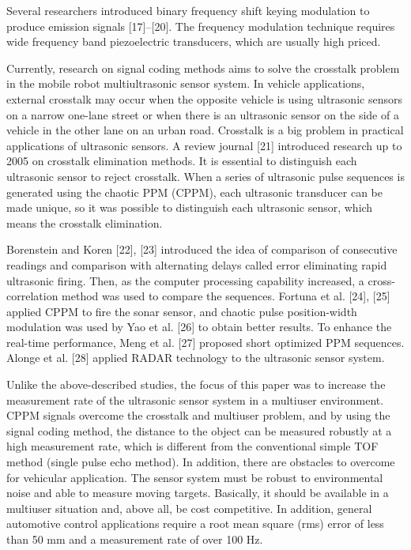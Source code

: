 Several researchers introduced binary frequency shift keying modulation to produce emission signals [17]–​[20]. The frequency modulation technique requires wide frequency band piezoelectric transducers, which are usually high priced.

Currently, research on signal coding methods aims to solve the crosstalk problem in the mobile robot multiultrasonic sensor system. In vehicle applications, external crosstalk may occur when the opposite vehicle is using ultrasonic sensors on a narrow one-lane street or when there is an ultrasonic sensor on the side of a vehicle in the other lane on an urban road. Crosstalk is a big problem in practical applications of ultrasonic sensors. A review journal [21] introduced research up to 2005 on crosstalk elimination methods. It is essential to distinguish each ultrasonic sensor to reject crosstalk. When a series of ultrasonic pulse sequences is generated using the chaotic PPM (CPPM), each ultrasonic transducer can be made unique, so it was possible to distinguish each ultrasonic sensor, which means the crosstalk elimination.

Borenstein and Koren [22], [23] introduced the idea of comparison of consecutive readings and comparison with alternating delays called error eliminating rapid ultrasonic firing. Then, as the computer processing capability increased, a cross-correlation method was used to compare the sequences. Fortuna et al. [24], [25] applied CPPM to fire the sonar sensor, and chaotic pulse position-width modulation was used by Yao et al. [26] to obtain better results. To enhance the real-time performance, Meng et al. [27] proposed short optimized PPM sequences. Alonge et al. [28] applied RADAR technology to the ultrasonic sensor system.

Unlike the above-described studies, the focus of this paper was to increase the measurement rate of the ultrasonic sensor system in a multiuser environment. CPPM signals overcome the crosstalk and multiuser problem, and by using the signal coding method, the distance to the object can be measured robustly at a high measurement rate, which is different from the conventional simple TOF method (single pulse echo method). In addition, there are obstacles to overcome for vehicular application. The sensor system must be robust to environmental noise and able to measure moving targets. Basically, it should be available in a multiuser situation and, above all, be cost competitive. In addition, general automotive control applications require a root mean square (rms) error of less than 50 mm and a measurement rate of over 100 Hz.

